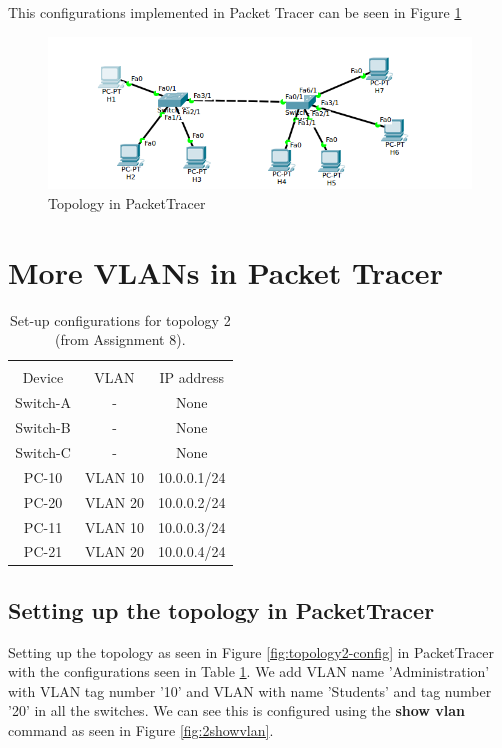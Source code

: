 \documentclass{article}
\begin{document}
This configurations implemented in Packet Tracer can be seen in Figure \ref{fig:1pt}

\begin{figure}[h]
    \centering
    \includegraphics[scale=0.4,width=\textwidth]{1pt}
    \caption{Topology in PacketTracer}
    \label{fig:1pt}
\end{figure}

\section{ More VLANs in Packet Tracer}

\begin{table}[h]
    \centering
    \begin{tabular}{|c|c|c|}
    \hline\\
    Device & VLAN & IP address \\
         Switch-A& - & None \\
         Switch-B& -& None \\
           Switch-C& - & None \\
         PC-10 & VLAN 10 & 10.0.0.1/24\\
         PC-20 & VLAN 20 & 10.0.0.2/24\\
         PC-11 & VLAN 10 & 10.0.0.3/24\\
         PC-21 & VLAN 20 & 10.0.0.4/24\\
         \hline
    \end{tabular}
    \caption{Set-up configurations for topology 2 (from Assignment 8). }
    \label{tab:topology2-config}
\end{table}

\subsection{Setting up the topology in PacketTracer}

Setting up  the topology as seen in Figure \ref{fig:topology2-config} in PacketTracer with the configurations seen in Table \ref{tab:topology2-config}. We add VLAN name 'Administration' with VLAN tag number '10' and VLAN with name 'Students' and tag number '20' in all the switches. We can see this is configured using the \textbf{show vlan} command as seen in Figure \ref{fig:2showvlan}. 
\end{document}
